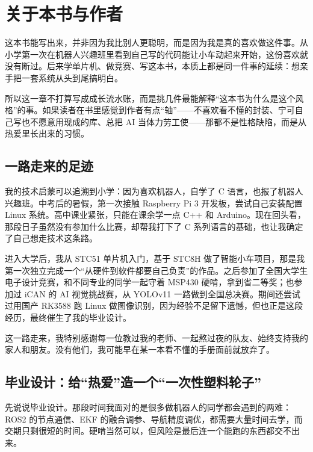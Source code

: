 \chapter{关于本书与作者} \label{ch:about-author}

这本书能写出来，并非因为我比别人更聪明，而是因为我是真的喜欢做这件事。从小学第一次在机器人兴趣班里看到自己写的代码能让小车动起来开始，这份喜欢就没有断过。后来学单片机、做竞赛、写这本书，本质上都是同一件事的延续：想亲手把一套系统从头到尾搞明白。

所以这一章不打算写成成长流水账，而是挑几件最能解释“这本书为什么是这个风格”的事。如果读者在书里感觉到作者有点“轴”——不喜欢看不懂的封装、宁可自己写也不愿意用现成的库、总把 AI 当体力劳工使——那都不是性格缺陷，而是从热爱里长出来的习惯。

\section{一路走来的足迹}

我的技术启蒙可以追溯到小学：因为喜欢机器人，自学了 C 语言，也报了机器人兴趣班。中考后的暑假，第一次接触 Raspberry Pi 3 开发板，尝试自己安装配置 Linux 系统。高中课业紧张，只能在课余学一点 C++ 和 Arduino。现在回头看，那段日子虽然没有参加什么比赛，却帮我打下了 C 系列语言的基础，也让我确定了自己想走技术这条路。

进入大学后，我从 STC51 单片机入门，基于 STC8H 做了智能小车项目，那是我第一次独立完成一个“从硬件到软件都要自己负责”的作品。之后参加了全国大学生电子设计竞赛，和不同专业的同学一起守着 MSP430 硬啃，拿到省二等奖；也参加过 iCAN 的 AI 视觉挑战赛，从 YOLOv11 一路做到全国总决赛。期间还尝试过用国产 RK3588 跑 Linux 做图像识别，因为经验不足留下遗憾，但也正是这段经历，最终催生了我的毕业设计。

这一路走来，我特别感谢每一位教过我的老师、一起熬过夜的队友、始终支持我的家人和朋友。没有他们，我可能早在某一本看不懂的手册面前就放弃了。

\section{毕业设计：给“热爱”造一个“一次性塑料轮子”}

先说说毕业设计。那段时间我面对的是很多做机器人的同学都会遇到的两难：ROS2 的节点通信、EKF 的融合调参、导航精度调优，都需要大量时间去学，而交期只剩很短的时间。硬啃当然可以，但风险是最后连一个能跑的东西都交不出来。

